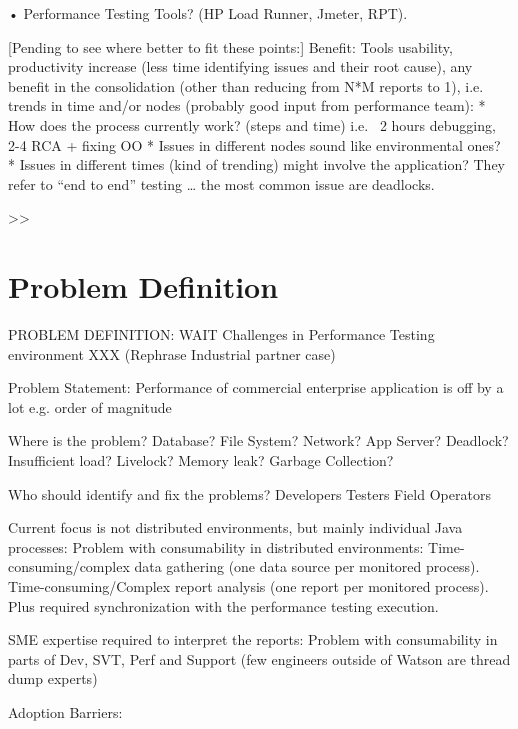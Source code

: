 \documentclass[runningheads,a4paper]{llncs}
\begin{document}
•	Performance Testing Tools? (HP Load Runner, Jmeter, RPT).

[Pending to see where better to fit these points:]
Benefit: Tools usability, productivity increase (less time identifying issues and their root cause), any benefit in the consolidation (other than reducing from N*M reports to 1), i.e. trends in time and/or nodes (probably good input from performance team):
* How does the process currently work? (steps and time) i.e. ~2 hours debugging, 2-4 RCA + fixing OO
* Issues in different nodes sound like environmental ones?
* Issues in different times (kind of trending) might involve the application?
They refer to “end to end” testing … the most common issue are deadlocks.

>>


\section{Problem Definition}

PROBLEM DEFINITION: WAIT Challenges in Performance Testing environment 
XXX (Rephrase Industrial partner case)

Problem Statement: Performance of commercial enterprise application is off by a
lot e.g. order of magnitude

Where is the problem?
	Database? 	File System?
	Network?	App Server?
	Deadlock?	Insufficient load?
	Livelock?	Memory leak?
	Garbage Collection?

Who should identify and fix the problems?
	Developers
	Testers
	Field Operators

Current focus is not distributed environments, but mainly individual Java processes:
Problem with consumability in distributed environments:
Time-consuming/complex data gathering (one data source per monitored process).
Time-consuming/Complex report analysis (one report per monitored process).
Plus required synchronization with the performance testing execution.

SME expertise required to interpret the reports:
Problem with consumability in parts of Dev, SVT, Perf and Support (few engineers outside of Watson are thread dump experts)


Adoption Barriers: 
\end{document}
